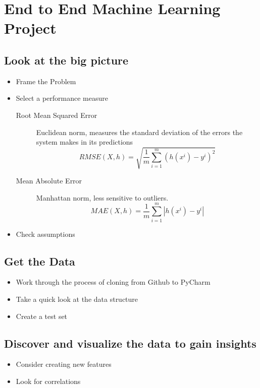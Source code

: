 \documentclass[10pt]{article}
\begin{document}
\section{End to End Machine Learning Project}%
\label{sec:end_to_end_machine_learning_project}

\subsection{Look at the big picture}%
\label{sub:look_at_the_big_picture}

\begin{itemize}
  \item Frame the Problem
  \item Select a performance measure
    \begin{description}
      \item[Root Mean Squared Error] Euclidean norm, measures the standard
        deviation of the errors the system makes in its predictions
        \[RMSE(X,h)=\sqrt{\frac{1}{m}\sum_{i=1}^{m}\left(h\left(x^i\right)-y^i\right)^2}\]
      \item[Mean Absolute Error] Manhattan norm, less sensitive to outliers.
        \[MAE(X, h)=\frac{1}{m}\sum_{i=1}^{m}\left|h\left(x^i\right)-y^i\right|\]
    \end{description}
  \item Check assumptions
\end{itemize}

\subsection{Get the Data}%
\label{sub:get_the_data}

\begin{itemize}
  \item Work through the process of cloning from Github to PyCharm
  \item Take a quick look at the data structure
  \item Create a test set
\end{itemize}

\subsection{Discover and visualize the data to gain insights}%
\label{sub:discover_and_visualize_the_data_to_gain_insights}

\begin{itemize}
  \item Consider creating new features
  \item Look for correlations
\end{itemize}
\end{document}
